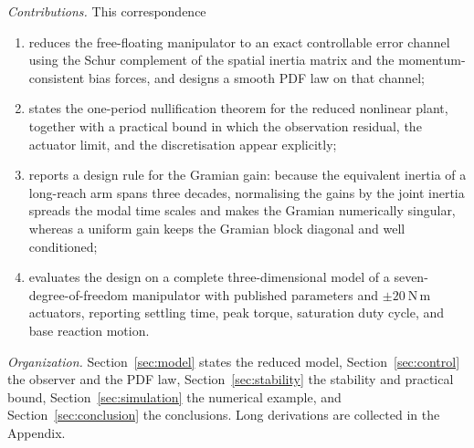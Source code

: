 \emph{Contributions.} This correspondence
\begin{enumerate}
\item reduces the free-floating manipulator to an exact controllable error channel using the Schur complement of the spatial inertia matrix and the momentum-consistent bias forces, and designs a smooth PDF law on that channel;
\item states the one-period nullification theorem for the reduced nonlinear plant, together with a practical bound in which the observation residual, the actuator limit, and the discretisation appear explicitly;
\item reports a design rule for the Gramian gain: because the equivalent inertia of a long-reach arm spans three decades, normalising the gains by the joint inertia spreads the modal time scales and makes the Gramian numerically singular, whereas a uniform gain keeps the Gramian block diagonal and well conditioned;
\item evaluates the design on a complete three-dimensional model of a seven-degree-of-freedom manipulator with published parameters and $\pm20~\mathrm{N\,m}$ actuators, reporting settling time, peak torque, saturation duty cycle, and base reaction motion.
\end{enumerate}

\emph{Organization.} Section~\ref{sec:model} states the reduced model, Section~\ref{sec:control} the observer and the PDF law, Section~\ref{sec:stability} the stability and practical bound, Section~\ref{sec:simulation} the numerical example, and Section~\ref{sec:conclusion} the conclusions. Long derivations are collected in the Appendix.
